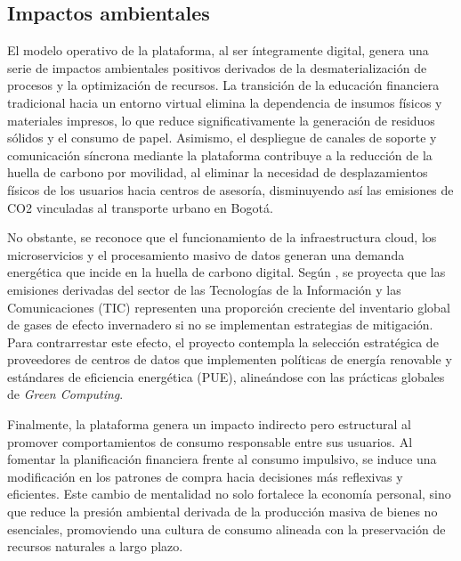 {}
\subsection*{Impactos ambientales}


El modelo operativo de la plataforma, al ser íntegramente digital, genera una serie de impactos ambientales positivos derivados de la desmaterialización de procesos y la optimización de recursos. La transición de la educación financiera tradicional hacia un entorno virtual elimina la dependencia de insumos físicos y materiales impresos, lo que reduce significativamente la generación de residuos sólidos y el consumo de papel. Asimismo, el despliegue de canales de soporte y comunicación síncrona mediante la plataforma contribuye a la reducción de la huella de carbono por movilidad, al eliminar la necesidad de desplazamientos físicos de los usuarios hacia centros de asesoría, disminuyendo así las emisiones de CO2 vinculadas al transporte urbano en Bogotá.

No obstante, se reconoce que el funcionamiento de la infraestructura cloud, los microservicios y el procesamiento masivo de datos generan una demanda energética que incide en la huella de carbono digital. Según \textcite{Belkhir2018}, se proyecta que las emisiones derivadas del sector de las Tecnologías de la Información y las Comunicaciones (TIC) representen una proporción creciente del inventario global de gases de efecto invernadero si no se implementan estrategias de mitigación. Para contrarrestar este efecto, el proyecto contempla la selección estratégica de proveedores de centros de datos que implementen políticas de energía renovable y estándares de eficiencia energética (PUE), alineándose con las prácticas globales de \textit{Green Computing}.

Finalmente, la plataforma genera un impacto indirecto pero estructural al promover comportamientos de consumo responsable entre sus usuarios. Al fomentar la planificación financiera frente al consumo impulsivo, se induce una modificación en los patrones de compra hacia decisiones más reflexivas y eficientes. Este cambio de mentalidad no solo fortalece la economía personal, sino que reduce la presión ambiental derivada de la producción masiva de bienes no esenciales, promoviendo una cultura de consumo alineada con la preservación de recursos naturales a largo plazo.